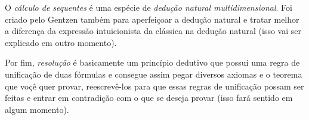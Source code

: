 O \textit{cálculo de sequentes} é uma espécie de \textit{dedução natural multidimensional}. Foi criado pelo Gentzen também para aperfeiçoar a dedução natural e tratar melhor a diferença da expressão intuicionista da clássica na dedução natural (isso vai ser explicado em outro momento).

Por fim, \textit{resolução} é basicamente um princípio dedutivo que possui uma regra de unificação de duas fórmulas e consegue assim pegar diversos axiomas e o teorema que voçê quer provar, reescrevê-los para que essas regras de unificação possam ser feitas e entrar em contradição com o que se deseja provar (isso fará sentido em algum momento).








